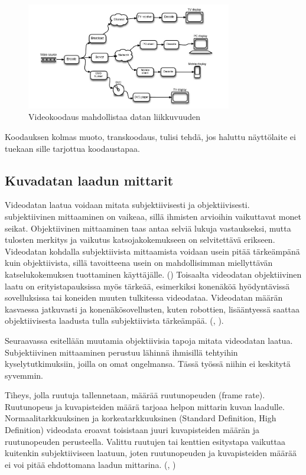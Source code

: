 \begin{figure}[ht]
	\centering
	\includegraphics[width=0.8\textwidth]{codec.jpg}
	\caption{Videokoodaus mahdollistaa datan liikkuvuuden}
	\label{fig:codec}
\end{figure}

Koodauksen kolmas muoto, transkoodaus, tulisi tehdä, jos haluttu näyttölaite ei
tuekaan sille tarjottua koodaustapaa.

\subsection{Kuvadatan laadun mittarit}

Videodatan laatua voidaan mitata subjektiivisesti ja objektiivisesti.
subjektiivinen mittaaminen on vaikeaa, sillä ihmisten arvioihin vaikuttavat
monet seikat. Objektiivinen mittaaminen taas antaa selviä lukuja vastaukseksi,
mutta tulosten merkitys ja vaikutus katsojakokemukseen on selvitettävä erikseen.
Videodatan kohdalla subjektiivista mittaamista voidaan usein pitää tärkeämpänä
kuin objektiivista, sillä tavoitteena usein on mahdollisimman miellyttävän
katselukokemuksen tuottaminen käyttäjälle. (\citealt{h264}) Toisaalta videodatan objektiivinen
laatu on erityistapauksissa myös tärkeää, esimerkiksi konenäköä hyödyntävissä
sovelluksissa tai koneiden muuten tulkitessa videodataa. Videodatan määrän
kasvaessa jatkuvasti ja konenäkösovellusten, kuten robottien, lisääntyessä
saattaa objektiivisesta laadusta tulla subjektiivista tärkeämpää. (\citealt{youtube},
\citealt{cisco}).

Seuraavassa esitellään muutamia objektiivisia tapoja mitata videodatan laatua.
Subjektiivinen mittaaminen perustuu lähinnä ihmisillä tehtyihin
kyselytutkimuksiin, joilla on omat ongelmansa. Tässä työssä niihin ei keskitytä
syvemmin.

Tiheys, jolla ruutuja tallennetaan, määrää ruutunopeuden (frame rate).
Ruutunopeus ja kuvapisteiden määrä tarjoaa helpon mittarin kuvan laadulle.
Normaalitarkkuuksinen ja korkeatarkkuuksinen (Standard Definition, High
Definition) videodata eroavat toisistaan juuri kuvapisteiden määrän ja
ruutunopeuden perusteella. Valittu ruutujen tai kenttien esitystapa vaikuttaa
kuitenkin subjektiiviseen laatuun, joten ruutunopeuden ja kuvapisteiden määrää
ei voi pitää ehdottomana laadun mittarina. (\citealt{h264}, \citealt{du})

